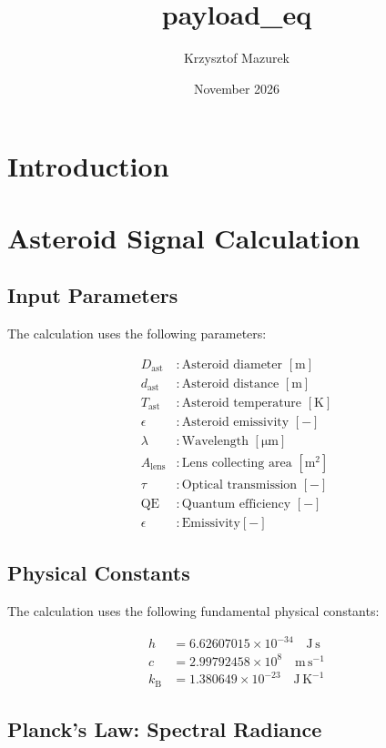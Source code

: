 \documentclass{article}
\title{payload_eq}
\author{Krzysztof Mazurek}
\date{November 2026}
\begin{document}
\section{Introduction}


\section{Asteroid Signal Calculation}

\subsection{Input Parameters}

The calculation uses the following parameters:

\begin{align}
D_{\mathrm{ast}} & : \text{Asteroid diameter } [\mathrm{m}] \\
d_{\mathrm{ast}} & : \text{Asteroid distance } [\mathrm{m}] \\
T_{\mathrm{ast}} & : \text{Asteroid temperature } [\mathrm{K}] \\
\epsilon & : \text{Asteroid emissivity } [-] \\
\lambda & : \text{Wavelength } [\mathrm{\mu m}] \\
A_{\mathrm{lens}} & : \text{Lens collecting area } [\mathrm{m^2}] \\
\tau & : \text{Optical transmission } [-] \\
\mathrm{QE} & : \text{Quantum efficiency } [-]\\
\epsilon & :  \text{Emissivity} [-]
\end{align}



\subsection{Physical Constants}

The calculation uses the following fundamental physical constants:

\begin{align}
h &= 6.62607015 \times 10^{-34}
\quad \mathrm{J\,s}
\\
c &= 2.99792458 \times 10^8
\quad \mathrm{m\,s^{-1}}
\\
k_{\mathrm{B}} &= 1.380649 \times 10^{-23}
\quad \mathrm{J\,K^{-1}}
\end{align}


\subsection{Planck's Law: Spectral Radiance}
\end{document}
